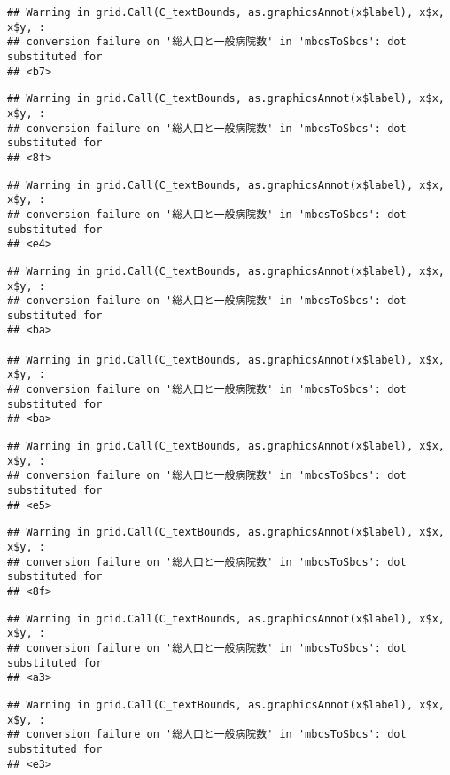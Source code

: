\documentclass[
]{article}
\begin{document}
\begin{verbatim}
## Warning in grid.Call(C_textBounds, as.graphicsAnnot(x$label), x$x, x$y, :
## conversion failure on '総人口と一般病院数' in 'mbcsToSbcs': dot substituted for
## <b7>
\end{verbatim}

\begin{verbatim}
## Warning in grid.Call(C_textBounds, as.graphicsAnnot(x$label), x$x, x$y, :
## conversion failure on '総人口と一般病院数' in 'mbcsToSbcs': dot substituted for
## <8f>
\end{verbatim}

\begin{verbatim}
## Warning in grid.Call(C_textBounds, as.graphicsAnnot(x$label), x$x, x$y, :
## conversion failure on '総人口と一般病院数' in 'mbcsToSbcs': dot substituted for
## <e4>
\end{verbatim}

\begin{verbatim}
## Warning in grid.Call(C_textBounds, as.graphicsAnnot(x$label), x$x, x$y, :
## conversion failure on '総人口と一般病院数' in 'mbcsToSbcs': dot substituted for
## <ba>

## Warning in grid.Call(C_textBounds, as.graphicsAnnot(x$label), x$x, x$y, :
## conversion failure on '総人口と一般病院数' in 'mbcsToSbcs': dot substituted for
## <ba>
\end{verbatim}

\begin{verbatim}
## Warning in grid.Call(C_textBounds, as.graphicsAnnot(x$label), x$x, x$y, :
## conversion failure on '総人口と一般病院数' in 'mbcsToSbcs': dot substituted for
## <e5>
\end{verbatim}

\begin{verbatim}
## Warning in grid.Call(C_textBounds, as.graphicsAnnot(x$label), x$x, x$y, :
## conversion failure on '総人口と一般病院数' in 'mbcsToSbcs': dot substituted for
## <8f>
\end{verbatim}

\begin{verbatim}
## Warning in grid.Call(C_textBounds, as.graphicsAnnot(x$label), x$x, x$y, :
## conversion failure on '総人口と一般病院数' in 'mbcsToSbcs': dot substituted for
## <a3>
\end{verbatim}

\begin{verbatim}
## Warning in grid.Call(C_textBounds, as.graphicsAnnot(x$label), x$x, x$y, :
## conversion failure on '総人口と一般病院数' in 'mbcsToSbcs': dot substituted for
## <e3>
\end{verbatim}
\end{document}

